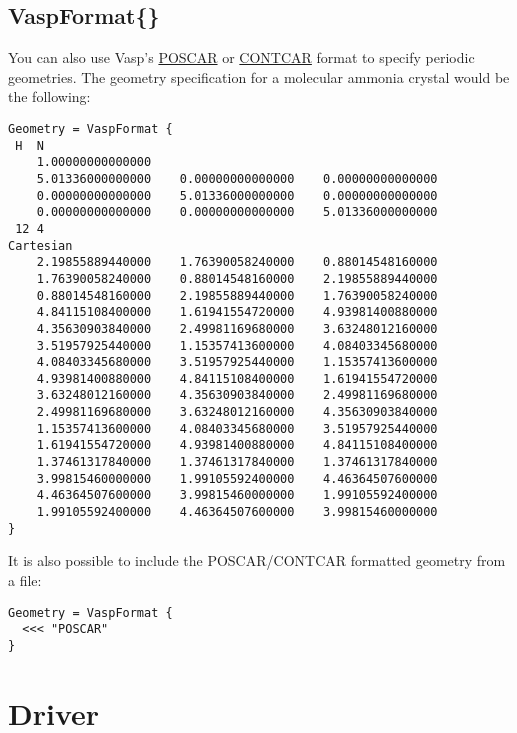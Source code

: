 \subsection{VaspFormat\{\}}
\label{sec:dftbp.VaspFormat}

You can also use Vasp's \href{https://www.vasp.at/wiki/index.php/POSCAR}{POSCAR} or
\href{https://www.vasp.at/wiki/index.php/CONTCAR}{CONTCAR} format to specify periodic geometries.
The geometry specification for a molecular ammonia crystal would be the following:
\begin{verbatim}
Geometry = VaspFormat {
 H  N
    1.00000000000000
    5.01336000000000    0.00000000000000    0.00000000000000
    0.00000000000000    5.01336000000000    0.00000000000000
    0.00000000000000    0.00000000000000    5.01336000000000
 12 4
Cartesian
    2.19855889440000    1.76390058240000    0.88014548160000
    1.76390058240000    0.88014548160000    2.19855889440000
    0.88014548160000    2.19855889440000    1.76390058240000
    4.84115108400000    1.61941554720000    4.93981400880000
    4.35630903840000    2.49981169680000    3.63248012160000
    3.51957925440000    1.15357413600000    4.08403345680000
    4.08403345680000    3.51957925440000    1.15357413600000
    4.93981400880000    4.84115108400000    1.61941554720000
    3.63248012160000    4.35630903840000    2.49981169680000
    2.49981169680000    3.63248012160000    4.35630903840000
    1.15357413600000    4.08403345680000    3.51957925440000
    1.61941554720000    4.93981400880000    4.84115108400000
    1.37461317840000    1.37461317840000    1.37461317840000
    3.99815460000000    1.99105592400000    4.46364507600000
    4.46364507600000    3.99815460000000    1.99105592400000
    1.99105592400000    4.46364507600000    3.99815460000000
}
\end{verbatim}
It is also possible to include the POSCAR/CONTCAR formatted geometry from a file:
\begin{verbatim}
Geometry = VaspFormat {
  <<< "POSCAR"
}
\end{verbatim}


\section{Driver}
\label{sec:dftbp.Driver}

